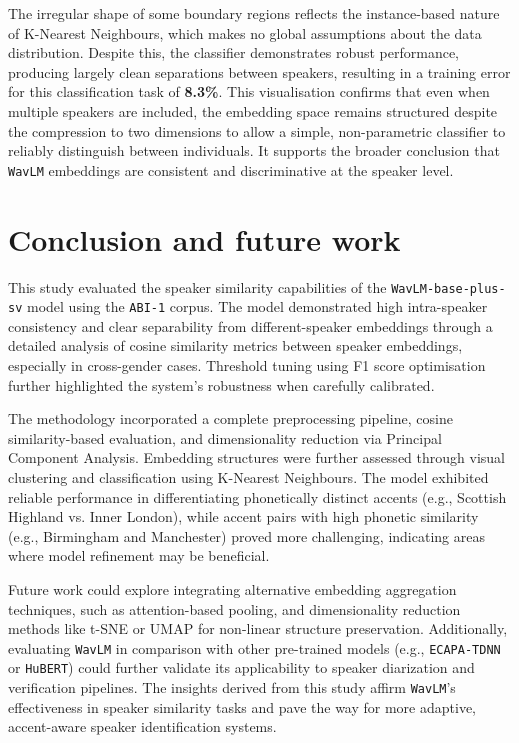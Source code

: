 \documentclass[conference]{IEEEtran}
\begin{document}
	The irregular shape of some boundary regions reflects the instance-based nature of K-Nearest Neighbours, which makes no global assumptions about the data distribution. Despite this, the classifier demonstrates robust performance, producing largely clean separations between speakers, resulting in a training error for this classification task of \textbf{8.3\%}. This visualisation confirms that even when multiple speakers are included, the embedding space remains structured despite the compression to two dimensions to allow a simple, non-parametric classifier to reliably distinguish between individuals. It supports the broader conclusion that \texttt{WavLM} embeddings are consistent and discriminative at the speaker level.
	
	
	
	\section{Conclusion and future work}
	
	This study evaluated the speaker similarity capabilities of the \texttt{WavLM-base-plus-sv} model using the \texttt{ABI-1} corpus. The model demonstrated high intra-speaker consistency and clear separability from different-speaker embeddings through a detailed analysis of cosine similarity metrics between speaker embeddings, especially in cross-gender cases. Threshold tuning using F1 score optimisation further highlighted the system's robustness when carefully calibrated.
	
	The methodology incorporated a complete preprocessing pipeline, cosine similarity-based evaluation, and dimensionality reduction via Principal Component Analysis. Embedding structures were further assessed through visual clustering and classification using K-Nearest Neighbours. The model exhibited reliable performance in differentiating phonetically distinct accents (e.g., Scottish Highland vs. Inner London), while accent pairs with high phonetic similarity (e.g., Birmingham and Manchester) proved more challenging, indicating areas where model refinement may be beneficial.
	
	Future work could explore integrating alternative embedding aggregation techniques, such as attention-based pooling, and dimensionality reduction methods like t-SNE or UMAP for non-linear structure preservation. Additionally, evaluating \texttt{WavLM} in comparison with other pre-trained models (e.g., \texttt{ECAPA-TDNN} or \texttt{HuBERT}) could further validate its applicability to speaker diarization and verification pipelines. The insights derived from this study affirm \texttt{WavLM}'s effectiveness in speaker similarity tasks and pave the way for more adaptive, accent-aware speaker identification systems.
	
\end{document}
